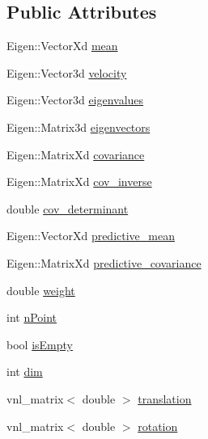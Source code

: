 \subsection*{\-Public \-Attributes}
\begin{DoxyCompactItemize}
\item 
\-Eigen\-::\-Vector\-Xd \hyperlink{class_gaussian_a2462f56c5ce1b88275ab4c59b99739a4}{mean}
\item 
\-Eigen\-::\-Vector3d \hyperlink{class_gaussian_a09ad4d04a27b2e6be4945719da025927}{velocity}
\item 
\-Eigen\-::\-Vector3d \hyperlink{class_gaussian_a040f0491de0917c6f9ad79ae7e68c02c}{eigenvalues}
\item 
\-Eigen\-::\-Matrix3d \hyperlink{class_gaussian_a430bc29a81c8a70d1ef6d9442bf7ba6f}{eigenvectors}
\item 
\-Eigen\-::\-Matrix\-Xd \hyperlink{class_gaussian_a62f08da00092ff4db7e0b864a2a68466}{covariance}
\item 
\-Eigen\-::\-Matrix\-Xd \hyperlink{class_gaussian_af2381be5187cf33c49d1c4575382b588}{cov\-\_\-inverse}
\item 
double \hyperlink{class_gaussian_a5c2ddadca218776ecc2d47ee7dfb2244}{cov\-\_\-determinant}
\item 
\-Eigen\-::\-Vector\-Xd \hyperlink{class_gaussian_af57af53a8c6d0006cc8a6a7658198eb0}{predictive\-\_\-mean}
\item 
\-Eigen\-::\-Matrix\-Xd \hyperlink{class_gaussian_afadc9984777174ca00506af635c9db1a}{predictive\-\_\-covariance}
\item 
double \hyperlink{class_gaussian_ae6192dadf70b84fa41dcf4498b5aaf52}{weight}
\item 
int \hyperlink{class_gaussian_a736f42df8823b1397eff83858e7864d1}{n\-Point}
\item 
bool \hyperlink{class_gaussian_acf67c5d6f25b4c13bfcfd72db9ab544f}{is\-Empty}
\item 
int \hyperlink{class_gaussian_ac8cca436c08c5c880bc1d7b6f9fae31d}{dim}
\item 
vnl\-\_\-matrix$<$ double $>$ \hyperlink{class_gaussian_a2469316effaaf6d03566d534fefa64fc}{translation}
\item 
vnl\-\_\-matrix$<$ double $>$ \hyperlink{class_gaussian_a859907145de3080604d20cc1105cd1e5}{rotation}
\end{DoxyCompactItemize}


